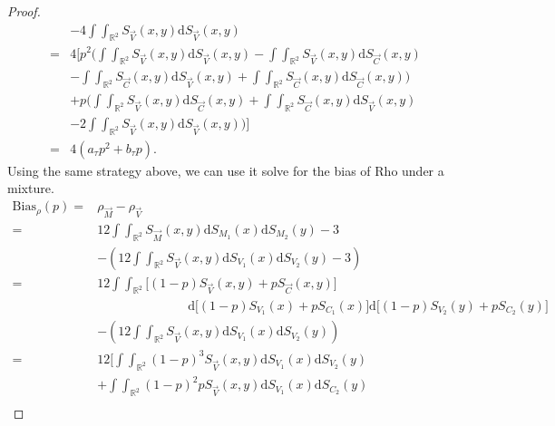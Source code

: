 \begin{proof}
\begin{align*}
        &-4\int\int_{\mathbb{R}^2}S_{\vec{V}}\left(x,y\right)\mathrm{d}S_{\vec{V}}\left(x,y\right)\\
        =&4\Bigg[p^2\bigg(\int\int_{\mathbb{R}^2}S_{\vec{V}}\left(x,y\right)\mathrm{d}S_{\vec{V}}\left(x,y\right)-\int\int_{\mathbb{R}^2}S_{\vec{V}}\left(x,y\right)\mathrm{d}S_{\vec{C}}\left(x,y\right)\\
        &-\int\int_{\mathbb{R}^2}S_{\vec{C}}\left(x,y\right)\mathrm{d}S_{\vec{V}}\left(x,y\right)+\int\int_{\mathbb{R}^2}S_{\vec{C}}\left(x,y\right)\mathrm{d}S_{\vec{C}}\left(x,y\right)\bigg)\\
        &+p\bigg(\int\int_{\mathbb{R}^2}S_{\vec{V}}\left(x,y\right)\mathrm{d}S_{\vec{C}}\left(x,y\right)+\int\int_{\mathbb{R}^2}S_{\vec{C}}\left(x,y\right)\mathrm{d}S_{\vec{V}}\left(x,y\right)\\
        &-2\int\int_{\mathbb{R}^2}S_{\vec{V}}\left(x,y\right)\mathrm{d}S_{\vec{V}}\left(x,y\right)\bigg)\Bigg]\\
        =&4\left(a_{\tau}p^2+b_{\tau}p\right).
    \end{align*}
    Using the same strategy above, we can use it solve for the bias of Rho under a mixture.
    \begin{align*}
        \text{Bias}_{\rho}\left(p\right)=&\rho_{\vec{M}}-\rho_{\vec{V}}\\
        =&12\int\int_{\mathbb{R}^2}S_{\vec{M}}\left(x,y\right)\mathrm{d}S_{M_1}\left(x\right)\mathrm{d}S_{M_2}\left(y\right)-3\\
        &-\left(12\int\int_{\mathbb{R}^2}S_{\vec{V}}\left(x,y\right)\mathrm{d}S_{V_1}\left(x\right)\mathrm{d}S_{V_2}\left(y\right)-3\right)\\
        =&12\int\int_{\mathbb{R}^2}\big[\left(1-p\right)S_{\vec{V}}\left(x,y\right)+pS_{\vec{C}}\left(x,y\right)\big]\\
        &\hspace{3cm}\mathrm{d}\big[\left(1-p\right)S_{V_1}\left(x\right)+pS_{C_1}\left(x\right)\big]\mathrm{d}\big[\left(1-p\right)S_{V_2}\left(y\right)+pS_{C_2}\left(y\right)\big]\\
        &-\left(12\int\int_{\mathbb{R}^2}S_{\vec{V}}\left(x,y\right)\mathrm{d}S_{V_1}\left(x\right)\mathrm{d}S_{V_2}\left(y\right)\right)\\
        =&12\bigg[\int\int_{\mathbb{R}^2}\left(1-p\right)^3S_{\vec{V}}\left(x,y\right)\mathrm{d}S_{V_1}\left(x\right)\mathrm{d}S_{V_2}\left(y\right)\\
        &+\int\int_{\mathbb{R}^2}\left(1-p\right)^2pS_{\vec{V}}\left(x,y\right)\mathrm{d}S_{V_1}\left(x\right)\mathrm{d}S_{C_2}\left(y\right)\\

\end{align*}
\end{proof}
